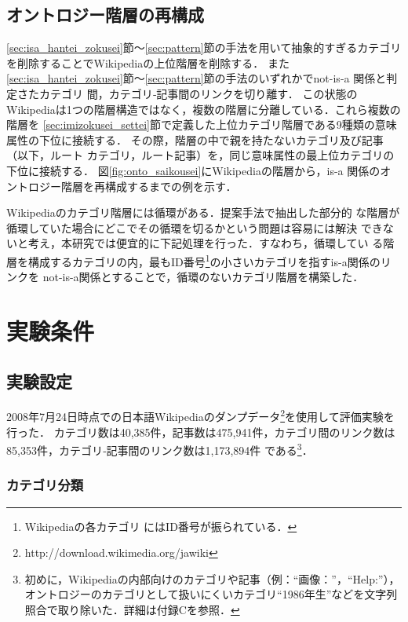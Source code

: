 \documentclass[japanese]{jnlp_1.4}
\begin{document}
\subsection{オントロジー階層の再構成}
\label{sec:touitsu_onto}

\ref{sec:isa_hantei_zokusei}節〜\ref{sec:pattern}節の手法を用いて抽象的すぎるカテゴリを削除することでWikipediaの上位階層を削除する．
また\ref{sec:isa_hantei_zokusei}節〜\ref{sec:pattern}節の手法のいずれかでnot-is-a 関係と判定さたカテゴリ
間，カテゴリ‐記事間のリンクを切り離す．
この状態のWikipediaは1つの階層構造ではなく，複数の階層に分離している．これら複数の階層を
\ref{sec:imizokusei_settei}節で定義した上位カテゴリ階層である9種類の意味属性の下位に接続する．
その際，階層の中で親を持たないカテゴリ及び記事（以下，ルート
カテゴリ，ルート記事）を，同じ意味属性の最上位カテゴリの下位に接続する．
図\ref{fig:onto_saikousei}にWikipediaの階層から，is-a 関係のオントロジー階層を再構成するまでの例を示す．

Wikipediaのカテゴリ階層には循環がある．提案手法で抽出した部分的
な階層が循環していた場合にどこでその循環を切るかという問題は容易には解決
できないと考え，本研究では便宜的に下記処理を行った．すなわち，循環してい
る階層を構成するカテゴリの内，最もID番号\footnote{Wikipediaの各カテゴリ
にはID番号が振られている．}の小さいカテゴリを指すis-a関係のリンクを
not-is-a関係とすることで，循環のないカテゴリ階層を構築した．



\section{実験条件}
\label{sec:zikken}

\subsection{実験設定}

2008年7月24日時点での日本語Wikipediaのダンプデータ\footnote{http://download.wikimedia.org/jawiki}を使用して評価実験を行った．
カテゴリ数は40,385件，記事数は475,941件，カテゴリ間のリンク数は85,353件，カテゴリ‐記事間のリンク数は1,173,894件
である\footnote{初めに，Wikipediaの内部向けのカテゴリや記事（例：``画像：''，``Help:''），オントロジーのカテゴリとして扱いにくいカテゴリ``1986年生''などを文字列照合で取り除いた．詳細は付録Cを参照．}．

\subsubsection{カテゴリ分類}
\end{document}
